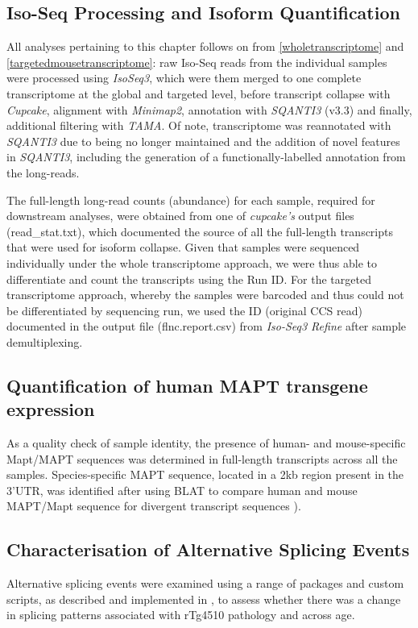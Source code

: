 \subsection{Iso-Seq Processing and Isoform Quantification}
All analyses pertaining to this chapter follows on from \cref{wholetranscriptome} and \cref{targetedmousetranscriptome}: raw Iso-Seq reads from the individual samples were processed using \textit{IsoSeq3}, which were them merged to one complete transcriptome at the global and targeted level, before transcript collapse with \textit{Cupcake}, alignment with \textit{Minimap2}, annotation with \textit{SQANTI3} (v3.3) and finally, additional filtering with \textit{TAMA}. Of note, transcriptome was reannotated with \textit{SQANTI3} due to  being no longer maintained and the addition of novel features in \textit{SQANTI3}, including the generation of a functionally-labelled annotation from the long-reads. 

The full-length long-read counts (abundance) for each sample, required for downstream analyses, were obtained from one of \textit{cupcake's} output files (read\_stat.txt), which documented the source of all the full-length transcripts that were used for isoform collapse. Given that samples were sequenced individually under the whole transcriptome approach, we were thus able to differentiate and count the transcripts using the Run ID. For the targeted transcriptome approach, whereby the samples were barcoded and thus could not be differentiated by sequencing run, we used the ID (original CCS read) documented in the output file (flnc.report.csv) from \textit{Iso-Seq3 Refine} after sample demultiplexing. 


\subsection{Quantification of human MAPT transgene expression} 
As a quality check of sample identity, the presence of human- and mouse-specific Mapt/MAPT sequences was determined in full-length transcripts across all the samples. Species-specific MAPT sequence, located in a 2kb region present in the 3'UTR, was identified after using BLAT\cite{Kent2002} to compare human and mouse MAPT/Mapt sequence for divergent transcript sequences \cite{Castanho2020}).  

\subsection{Characterisation of Alternative Splicing Events} 
Alternative splicing events were examined using a range of packages and custom scripts, as described and implemented in \label{sec:AS_methods}, to assess whether there was a change in splicing patterns associated with rTg4510 pathology and across age. 



